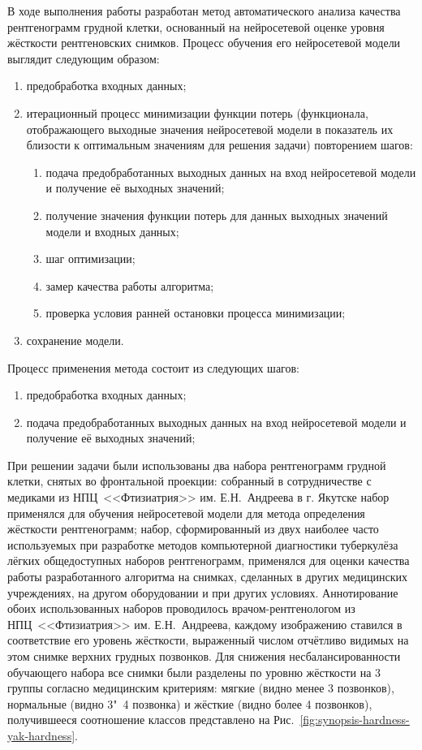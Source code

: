В ходе выполнения работы разработан метод автоматического анализа качества рентгенограмм грудной клетки, основанный на нейросетевой оценке уровня жёсткости рентгеновских снимков. Процесс обучения его нейросетевой модели выглядит следующим образом:
\begin{enumerate}[beginpenalty=10000]
	\item предобработка входных данных;
	\item итерационный процесс минимизации функции потерь (функционала, отображающего выходные значения нейросетевой модели в показатель их близости к оптимальным значениям для решения задачи) повторением шагов:
	\begin{enumerate}[beginpenalty=10000]
		\item подача предобработанных выходных данных на вход нейросетевой модели и получение её выходных значений;
		\item получение значения функции потерь для данных выходных значений модели и входных данных;
		\item шаг оптимизации;
		\item замер качества работы алгоритма;
		\item проверка условия ранней остановки процесса минимизации;
	\end{enumerate}
	\item сохранение модели.	
\end{enumerate}

Процесс применения метода состоит из следующих шагов:
\begin{enumerate}[beginpenalty=10000]
	\item предобработка входных данных;
	\item подача предобработанных выходных данных на вход нейросетевой модели и получение её выходных значений;
\end{enumerate}

При решении задачи были использованы два набора рентгенограмм грудной клетки, снятых во фронтальной проекции: собранный в сотрудничестве с медиками из НПЦ~<<Фтизиатрия>> им. Е.Н.~Андреева в г. Якутске набор применялся для обучения нейросетевой модели для метода определения жёсткости рентгенограмм; набор, сформированный из двух наиболее часто используемых при разработке методов компьютерной диагностики туберкулёза лёгких общедоступных наборов рентгенограмм, применялся для оценки качества работы разработанного алгоритма на снимках, сделанных в других медицинских учреждениях, на другом оборудовании и при других условиях. Аннотирование обоих использованных наборов проводилось врачом-рентгенологом из НПЦ~<<Фтизиатрия>> им. Е.Н.~Андреева, каждому изображению ставился в соответствие его уровень жёсткости, выраженный числом отчётливо видимых на этом снимке верхних грудных позвонков. Для снижения несбалансированности обучающего набора все снимки были разделены по уровню жёсткости на 3 группы согласно медицинским критериям: мягкие (видно менее 3 позвонков), нормальные (видно 3"~4 позвонка) и жёсткие (видно более 4 позвонков), получившееся соотношение классов представлено на Рис.~\ref{fig:synopsis-hardness-yak-hardness}.

